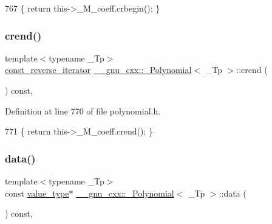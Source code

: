 \begin{DoxyCode}
767       \{ \textcolor{keywordflow}{return} this->\_M\_coeff.crbegin(); \}
\end{DoxyCode}
\mbox{\label{class____gnu__cxx_1_1__Polynomial_a0b314ced62a607798572646a76f2ac35}} 
\subsubsection{\texorpdfstring{crend()}{crend()}}
{\footnotesize\ttfamily template$<$typename \+\_\+\+Tp$>$ \\
\hyperlink{class____gnu__cxx_1_1__Polynomial_a2a042a80127ab9a7b0349a54791e59af}{const\+\_\+reverse\+\_\+iterator} \hyperlink{class____gnu__cxx_1_1__Polynomial}{\+\_\+\+\_\+gnu\+\_\+cxx\+::\+\_\+\+Polynomial}$<$ \+\_\+\+Tp $>$\+::crend (\begin{DoxyParamCaption}{ }\end{DoxyParamCaption}) const\hspace{0.3cm}{\ttfamily [inline]}, {\ttfamily [noexcept]}}



Definition at line 770 of file polynomial.\+h.


\begin{DoxyCode}
771       \{ \textcolor{keywordflow}{return} this->\_M\_coeff.crend(); \}
\end{DoxyCode}
\mbox{\label{class____gnu__cxx_1_1__Polynomial_a85ee127ade1524a130ac9be44d80a770}} 
\subsubsection{\texorpdfstring{data()}{data()}\hspace{0.1cm}{\footnotesize\ttfamily [1/2]}}
{\footnotesize\ttfamily template$<$typename \+\_\+\+Tp$>$ \\
const \hyperlink{class____gnu__cxx_1_1__Polynomial_a725563351f50e76084a7a016c06f8a53}{value\+\_\+type}$\ast$ \hyperlink{class____gnu__cxx_1_1__Polynomial}{\+\_\+\+\_\+gnu\+\_\+cxx\+::\+\_\+\+Polynomial}$<$ \+\_\+\+Tp $>$\+::data (\begin{DoxyParamCaption}{ }\end{DoxyParamCaption}) const\hspace{0.3cm}{\ttfamily [inline]}, {\ttfamily [noexcept]}}

